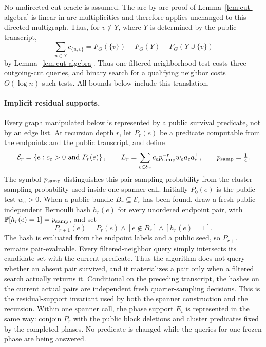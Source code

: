 \documentclass[11pt]{article}
\theoremstyle{definition}
\newcommand{\Prb}{\mathbb{P}}
\newcommand{\set}[1]{\left\{#1\right\}}
\begin{document}
No undirected-cut oracle is assumed.  The arc-by-arc proof of
Lemma~\ref{lem:cut-algebra} is linear in arc multiplicities and therefore
applies unchanged to this directed multigraph.  Thus, for $v\notin Y$, where
$Y$ is determined by the public transcript,
\[
 \sum_{u\in Y}c_{\{u,v\}}
 =F_G(\{v\})+F_G(Y)-F_G(Y\cup\{v\})
\]
by Lemma~\ref{lem:cut-algebra}.  Thus one filtered-neighborhood test costs
three outgoing-cut queries, and binary search for a qualifying neighbor costs
$O(\log n)$ such tests.  All bounds below include this translation.

\paragraph{Implicit residual supports.}
Every graph manipulated below is represented by a public survival predicate,
not by an edge list.  At recursion depth $r$, let $P_r(e)$ be a predicate
computable from the endpoints and the public transcript, and define
\[
 \mathcal E_r=\set{e:c_e>0\text{ and }P_r(e)},\qquad
 L_r=\sum_{e\in\mathcal E_r}c_ep_{\rm samp}^{-r}w_ea_ea_e^\top ,
 \qquad p_{\rm samp}=\tfrac14 .
\]
The symbol $p_{\rm samp}$ distinguishes this pair-sampling probability from
the cluster-sampling probability used inside one spanner call.
Initially $P_0(e)$ is the public test $w_e>0$.  When a public bundle
$B_r\subseteq\mathcal E_r$ has been found, draw a fresh public independent
Bernoulli hash $h_r(e)$ for every unordered endpoint pair, with
$\Prb[h_r(e)=1]=p_{\rm samp}$, and set
\begin{equation}\label{eq:survival-predicate}
 P_{r+1}(e)=P_r(e)\wedge[e\notin B_r]\wedge[h_r(e)=1].
\end{equation}
The hash is evaluated from the endpoint labels and a public seed, so
$P_{r+1}$ remains pair-evaluable.  Every filtered-neighbor query simply
intersects its candidate set with the current predicate.  Thus the algorithm
does not query whether an absent pair survived, and it materializes a pair
only when a filtered search actually returns it.  Conditional on the preceding
transcript, the hashes on the current actual pairs are independent fresh
quarter-sampling decisions.  This is the residual-support invariant used by
both the spanner construction and the recursion.  Within one spanner call,
the phase support $E_i$ is represented in the same way: conjoin $P_r$ with
the public block deletions and cluster predicates fixed by the completed
phases.  No predicate is changed while the queries for one frozen phase are
being answered.
\end{document}
